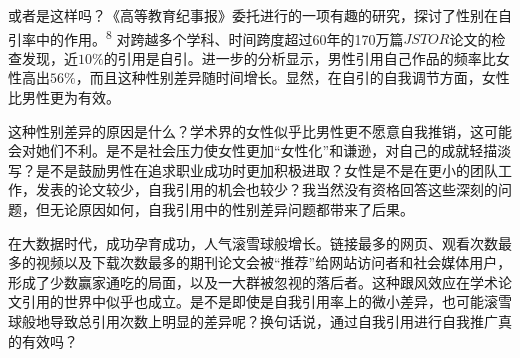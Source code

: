 或者是这样吗？《高等教育纪事报》委托进行的一项有趣的研究，探讨了性别在自引率中的作用。\textsuperscript{8} 对跨越多个学科、时间跨度超过60年的170万篇$JSTOR$论文的检查发现，近$10\%$的引用是自引。进一步的分析显示，男性引用自己作品的频率比女性高出$56\%$，而且这种性别差异随时间增长。显然，在自引的自我调节方面，女性比男性更为有效。

这种性别差异的原因是什么？学术界的女性似乎比男性更不愿意自我推销，这可能会对她们不利。是不是社会压力使女性更加“女性化”和谦逊，对自己的成就轻描淡写？是不是鼓励男性在追求职业成功时更加积极进取？女性是不是在更小的团队工作，发表的论文较少，自我引用的机会也较少？我当然没有资格回答这些深刻的问题，但无论原因如何，自我引用中的性别差异问题都带来了后果。

在大数据时代，成功孕育成功，人气滚雪球般增长。链接最多的网页、观看次数最多的视频以及下载次数最多的期刊论文会被“推荐”给网站访问者和社会媒体用户，形成了少数赢家通吃的局面，以及一大群被忽视的落后者。这种跟风效应在学术论文引用的世界中似乎也成立。是不是即使是自我引用率上的微小差异，也可能滚雪球般地导致总引用次数上明显的差异呢？换句话说，通过自我引用进行自我推广真的有效吗？

